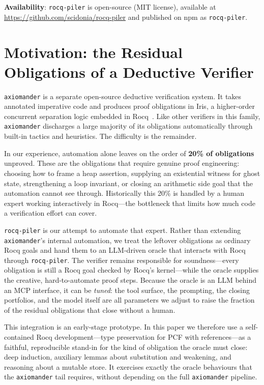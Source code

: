 \documentclass[11pt,a4paper]{article}
\newcommand{\tool}{\texttt{rocq-piler}\xspace}
\newcommand{\axm}{\texttt{axiomander}\xspace}
\begin{document}
\textbf{Availability}: \tool is open-source (MIT license), available at
\url{https://github.com/scidonia/rocq-piler} and published on npm as
\texttt{rocq-piler}.

\section{Motivation: the Residual Obligations of a Deductive Verifier}
\label{sec:axiomander}

\axm is a separate open-source deductive verification system. It takes annotated
imperative code and produces proof obligations in Iris, a higher-order
concurrent separation logic embedded in Rocq~\cite{jung2018iris}. Like other
verifiers in this family, \axm discharges a large majority of its obligations
automatically through built-in tactics and heuristics. The difficulty is the
remainder.

In our experience, automation alone leaves on the order of \textbf{20\% of
obligations} unproved. These are the obligations that require genuine proof
engineering: choosing how to frame a heap assertion, supplying an existential
witness for ghost state, strengthening a loop invariant, or closing an
arithmetic side goal that the automation cannot see through. Historically this
20\% is handled by a human expert working interactively in Rocq---the bottleneck
that limits how much code a verification effort can cover.

\tool is our attempt to automate that expert. Rather than extending \axm's
internal automation, we treat the leftover obligations as ordinary Rocq goals
and hand them to an LLM-driven oracle that interacts with Rocq through \tool. The
verifier remains responsible for soundness---every obligation is still a Rocq
goal checked by Rocq's kernel---while the oracle supplies the creative,
hard-to-automate proof steps. Because the oracle is an LLM behind an MCP
interface, it can be \emph{tuned}: the tool surface, the prompting, the closing
portfolios, and the model itself are all parameters we adjust to raise the
fraction of the residual obligations that close without a human.

This integration is an early-stage prototype. In this paper we therefore use a
self-contained Rocq development---type preservation for PCF with
references---as a faithful, reproducible stand-in for the kind of obligation the
oracle must close: deep induction, auxiliary lemmas about substitution and
weakening, and reasoning about a mutable store. It exercises exactly the
oracle behaviours that the \axm tail requires, without depending on the full
\axm pipeline.
\end{document}
